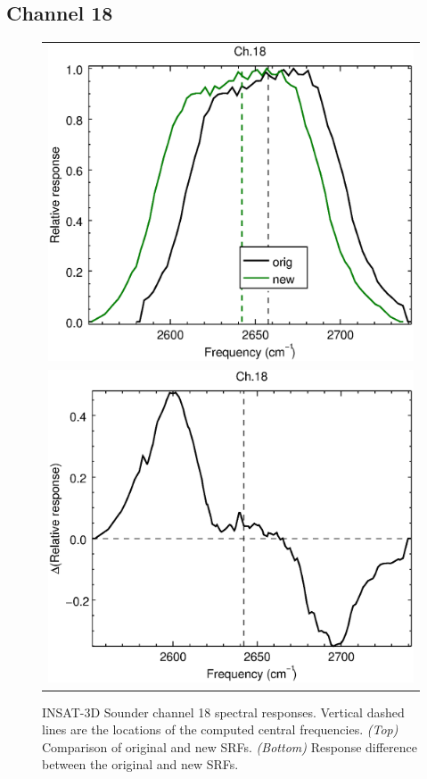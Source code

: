 \subsection{Channel 18}
\begin{figure}[H]
  \centering
  \begin{tabular}{c}
    \includegraphics[scale=0.55]{graphics/sndr/srf/sndr_insat3d-18.eps} \\
    \includegraphics[scale=0.55]{graphics/sndr/srf/sndr_insat3d-18.difference.eps}
  \end{tabular}
  \caption{INSAT-3D Sounder channel 18 spectral responses. Vertical dashed lines are the locations of the computed central frequencies. \emph{(Top)} Comparison of original and new SRFs. \emph{(Bottom)} Response difference between the original and new SRFs.}
  \label{fig:sndr_ch18}
\end{figure}
